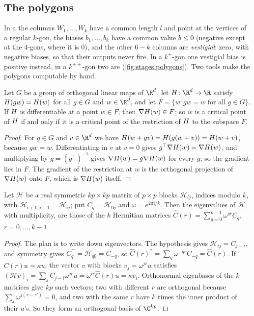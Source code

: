 \begin{refsection}
\subsection*{The polygons}

In a  the columns $W_1,\dots,W_k$ have a common length $l$ and point at the vertices of a regular $k$-gon, the biases $b_1,\dots,b_k$ have a common value $b\le0$ (negative except at the $4$-gons, where it is $0$), and the other $6-k$ columns are \emph{vestigial}: zero, with negative biases, so that their outputs never fire. In a $k^+$-gon one vestigial bias is positive instead, in a $k^{++}$-gon two are (\cref{fig:stages:polygons}). Two tools make the polygons computable by hand.

\begin{lemma}\label{lem:stages:symmetric}
Let $G$ be a group of orthogonal linear maps of $\R^d$, let $\stagesH\colon\R^d\to\R$ satisfy $H(gw)=H(w)$ for all $g\in G$ and $w\in\R^d$, and let $F=\{w:gw=w\text{ for all }g\in G\}$. If $H$ is differentiable at a point $w\in F$, then $\nabla H(w)\in F$; so $w$ is a critical point of $H$ if and only if it is a critical point of the restriction of $H$ to the subspace $F$.
\end{lemma}

\begin{proof}
For $g\in G$ and $v\in\R^d$ we have $H(w+gv)=H(g(w+v))=H(w+v)$, because $gw=w$. Differentiating in $v$ at $v=0$ gives $g^\top\nabla H(w)=\nabla H(w)$, and multiplying by $g=(g^\top)^{-1}$ gives $\nabla H(w)=g\nabla H(w)$ for every $g$, so the gradient lies in $F$. The gradient of the restriction at $w$ is the orthogonal projection of $\nabla H(w)$ onto $F$, which is $\nabla H(w)$ itself.
\end{proof}

\begin{lemma}\label{lem:stages:circulant}
Let $\mathcal H$ be a real symmetric $kp\times kp$ matrix of $p\times p$ blocks $\mathcal H_{ij}$, indices modulo $k$, with $\mathcal H_{i+1,j+1}=\mathcal H_{ij}$; put $C_q=\mathcal H_{0q}$ and $\omega=e^{2\pi\mathrm i/k}$. Then the eigenvalues of $\mathcal H$, with multiplicity, are those of the $k$ Hermitian matrices $\hat C(r)=\sum_{q=0}^{k-1}\omega^{qr}C_q$, $r=0,\dots,k-1$.
\end{lemma}

\begin{proof}
The plan is to write down eigenvectors. The hypothesis gives $\mathcal H_{ij}=C_{j-i}$, and symmetry gives $C_q^\top=\mathcal H_{q0}=C_{-q}$, so $\hat C(r)^*=\sum_q\omega^{-qr}C_{-q}=\hat C(r)$. If $\hat C(r)u=\kappa u$, the vector $v$ with blocks $v_j=\omega^{jr}u$ satisfies $(\mathcal Hv)_i=\sum_jC_{j-i}\omega^{jr}u=\omega^{ir}\hat C(r)u=\kappa v_i$. Orthonormal eigenbases of the $k$ matrices give $kp$ such vectors; two with different $r$ are orthogonal because $\sum_j\omega^{j(r-r')}=0$, and two with the same $r$ have $k$ times the inner product of their $u$'s. So they form an orthogonal basis of $\C^{kp}$.
\end{proof}


\end{refsection}
